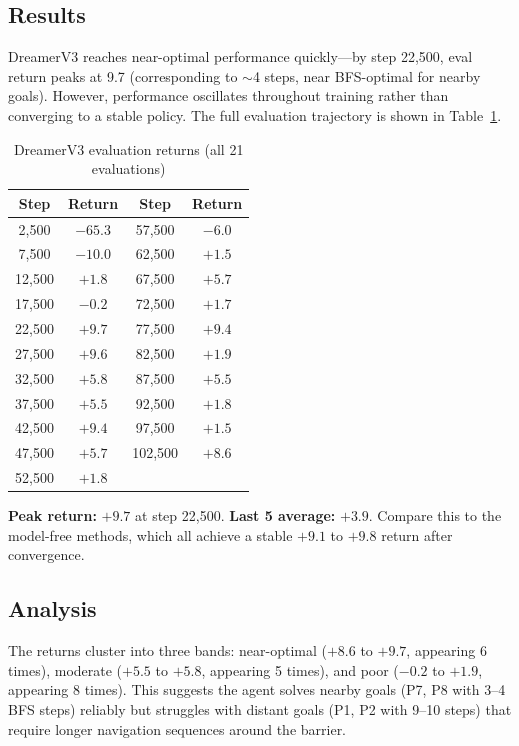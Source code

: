 \documentclass[letterpaper]{article}
\begin{document}
\subsection{Results}

DreamerV3 reaches near-optimal performance quickly---by step 22,500, eval return peaks at 9.7 (corresponding to $\sim$4 steps, near BFS-optimal for nearby goals). However, performance oscillates throughout training rather than converging to a stable policy. The full evaluation trajectory is shown in Table~\ref{tab:dreamer_qa}.

\begin{table}[H]
\centering
\caption{DreamerV3 evaluation returns (all 21 evaluations)}
\label{tab:dreamer_qa}
\begin{tabular}{@{}cccc@{}}
\toprule
Step & Return & Step & Return \\
\midrule
2,500   & $-65.3$ & 57,500  & $-6.0$ \\
7,500   & $-10.0$ & 62,500  & $+1.5$ \\
12,500  & $+1.8$  & 67,500  & $+5.7$ \\
17,500  & $-0.2$  & 72,500  & $+1.7$ \\
22,500  & $+9.7$  & 77,500  & $+9.4$ \\
27,500  & $+9.6$  & 82,500  & $+1.9$ \\
32,500  & $+5.8$  & 87,500  & $+5.5$ \\
37,500  & $+5.5$  & 92,500  & $+1.8$ \\
42,500  & $+9.4$  & 97,500  & $+1.5$ \\
47,500  & $+5.7$  & 102,500 & $+8.6$ \\
52,500  & $+1.8$  &         &        \\
\bottomrule
\end{tabular}
\end{table}

\textbf{Peak return:} $+9.7$ at step 22,500. \textbf{Last 5 average:} $+3.9$. Compare this to the model-free methods, which all achieve a stable $+9.1$ to $+9.8$ return after convergence.

\subsection{Analysis}

The returns cluster into three bands: near-optimal ($+8.6$ to $+9.7$, appearing 6 times), moderate ($+5.5$ to $+5.8$, appearing 5 times), and poor ($-0.2$ to $+1.9$, appearing 8 times). This suggests the agent solves nearby goals (P7, P8 with 3--4 BFS steps) reliably but struggles with distant goals (P1, P2 with 9--10 steps) that require longer navigation sequences around the barrier.
\end{document}
